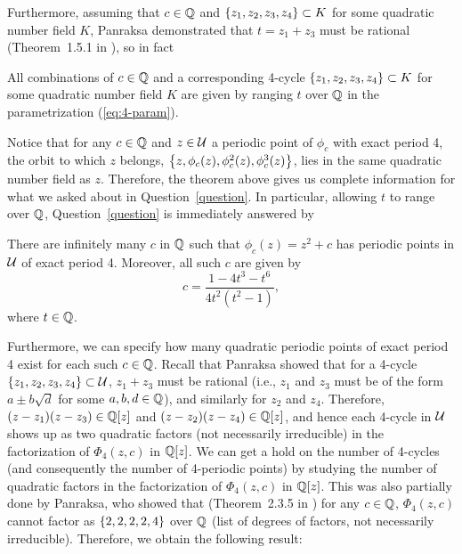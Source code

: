 Furthermore, assuming that $c \in \mathbb{Q}$ and $\left\{z_1, z_2, z_3, z_4\right\}
\subset K$ for some quadratic number field $K$, Panraksa demonstrated
that $t = z_1 + z_3$ must be rational (Theorem~1.5.1 in
\cite{MR2982105}), so in fact

\begin{theorem} 
  All combinations of $c \in \mathbb{Q}$ and a corresponding 4-cycle
  $\left\{z_1, z_2, z_3, z_4\right\} \subset K$ for some quadratic number field
  $K$ are given by ranging $t$ over $\mathbb{Q}$ in the parametrization
  (\ref{eq:4-param}).
\end{theorem}

Notice that for any $c \in \mathbb{Q}$ and $z \in \mathcal{U}$ a periodic point of
$\phi_c$ with exact period 4, the orbit to which $z$ belongs, $\left\{z,
  \phi_c(z), \phi_c^2(z), \phi_c^3(z)\right\}$, lies in the same quadratic
number field as $z$. Therefore, the theorem above gives us complete
information for what we asked about in Question~\ref{question}. In
particular, allowing $t$ to range over $\mathbb{Q}$, Question~\ref{question}
is immediately answered by

\begin{corollary}
  There are infinitely many $c$ in $\mathbb{Q}$ such that $\phi_c(z) = z^2 +
  c$ has periodic points in $\mathcal{U}$ of exact period 4. Moreover, all such
  $c$ are given by
  \[
  c = \frac{1 - 4t^3 - t^6}{4t^2(t^2 - 1)},
  \]
  where $t \in \mathbb{Q}$.
\end{corollary}

Furthermore, we can specify how many quadratic periodic points of
exact period 4 exist for each such $c \in \mathbb{Q}$. Recall that Panraksa
showed that for a 4-cycle $\left\{z_1, z_2, z_3, z_4\right\} \subset \mathcal{U}$, $z_1
+ z_3$ must be rational (i.e., $z_1$ and $z_3$ must be of the form $a
\pm b \sqrt{d}$ for some $a, b, d \in \mathbb{Q}$), and similarly for $z_2$
and $z_4$. Therefore, $(z - z_1)(z - z_3) \in \mathbb{Q}[z]$ and $(z - z_2)(z
- z_4) \in \mathbb{Q}[z]$, and hence each 4-cycle in $\mathcal{U}$ shows up as two
quadratic factors (not necessarily irreducible) in the factorization
of $\Phi_4(z, c)$ in $\mathbb{Q}[z]$. We can get a hold on the number of
4-cycles (and consequently the number of 4-periodic points) by
studying the number of quadratic factors in the factorization of
$\Phi_4(z, c)$ in $\mathbb{Q}[z]$. This was also partially done by Panraksa,
who showed that (Theorem~2.3.5 in \cite{MR2982105}) for any $c \in
\mathbb{Q}$, $\Phi_4(z, c)$ cannot factor as $\left\{2, 2, 2, 2, 4\right\}$ over $\mathbb{Q}$
(list of degrees of factors, not necessarily irreducible). Therefore,
we obtain the following result:

